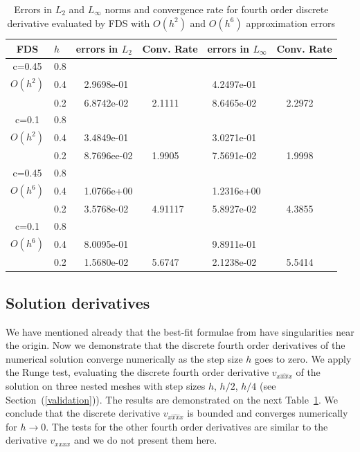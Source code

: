 \documentclass[preprint]{elsarticle}
\newcommand{\rf}[1]{(\ref{#1})}
\begin{document}
 \begin{center}
\begin{table}[ht]
\centering
		\begin{tabular}{||c|l|ll|ll||}
			\hline
			\hline
      FDS       & $h$ &errors in $L_2$&Conv. Rate& errors in $L_\infty$&Conv. Rate\\
   			\hline 
					\hline 
      c=0.45    &0.8    &             &            &           &   \\
   $O(h^2)$     &0.4    &~ 2.9698e-01  &            &~4.2497e-01 &   \\
                &0.2   &~ 6.8742e-02  &~~2.1111  &~8.6465e-02 &~~2.2972 \\
               	 \hline 
     c=0.1      &0.8   &             &           &                & \\
     $O(h^2)$   &0.4   &~ 3.4849e-01  &             &~3.0271e-01      &    \\
                &0.2  &~ 8.7696ee-02 &~~1.9905       &~7.5691e-02      &~~1.9998  \\
			\hline
			\hline 	
      c=0.45    &0.8   &            &            &             &    \\
       $O(h^6)$ &0.4   &~ 1.0766e+00   &           &~1.2316e+00  &   \\
                &0.2  &~ 3.5768e-02 &~~4.91117    &~5.8927e-02  &~~4.3855  \\
					  			\hline 	
     c=0.1      &0.8  &            &               &               &     \\
     $O(h^6)$  &0.4   &~ 8.0095e-01  &              &~9.8911e-01      &        \\
               &0.2  &~ 1.5680e-02&~~5.6747        &~2.1238e-02 &~~5.5414       \\
		   \hline
			\hline 
		\end{tabular}
		\caption{Errors  in $L_2$ and $L_\infty$ norms and  convergence  rate for  fourth order discrete derivative  evaluated by FDS with $O(h^2)$ and $O(h^6)$ approximation errors}
\label{tab:fourth-der}
\end{table}
\end{center}

\subsection{Solution derivatives}

We have mentioned already that the best-fit formulae from \cite{Ch2011} have singularities near the origin. 
Now we demonstrate  that the discrete fourth order derivatives of the numerical solution converge numerically as the step size $h$ goes to zero.
We apply the Runge test, evaluating the discrete fourth order derivative $v_{\widehat{xxxx}}$ of the solution on three nested meshes with step sizes $h$, $h/2$, $h/4$ (see Section~\rf{validation}).  The results are demonstrated on the next Table~\ref{tab:fourth-der}.  
We conclude that the discrete  derivative $v_{\widehat{xxxx}}$ is bounded and converges numerically for $h\rightarrow 0$. The tests for the other fourth order derivatives are similar to the derivative $v_{xxxx}$ and we do not present them here.
\end{document}

